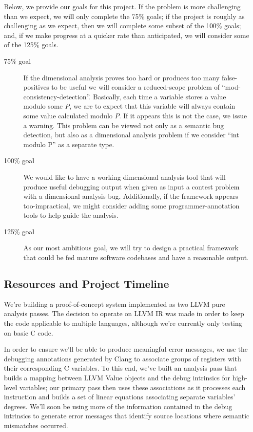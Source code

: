 \documentclass[12pt]{article}
\begin{document}
Below, we provide our goals for this project. If the problem is more challenging than we expect, we will only complete the 75\% goals; if the project is roughly as challenging as we expect, then we will complete some subset of the 100\% goals; and, if we make progress at a quicker rate than anticipated, we will consider some of the 125\% goals.
\begin{description}
\item [75\% goal] If the dimensional analysis proves too hard or produces too many false-positives to be useful we will consider a reduced-scope problem of ``mod-consistency-detection''. Basically, each time a variable stores a value modulo some $P$, we are to expect that this variable will always contain some value calculated modulo $P$. If it appears this is not the case, we issue a warning. This problem can be viewed not only as a semantic bug detection, but also as a dimensional analysis problem if we consider ``int modulo P'' as a separate type.

\item [100\% goal] We would like to have a working dimensional analysis tool that will produce useful debugging output when given as input a contest problem with a dimensional analysis bug. Additionally, if the framework appears too-impractical, we might consider adding some programmer-annotation tools to help guide the analysis. 

\item [125\% goal] As our most ambitious goal, we will try to design a practical framework that could be fed mature software codebases and have a reasonable output.
\end{description}

\subsection{Resources and Project Timeline}

We're building a proof-of-concept system implemented as two LLVM pure analysis passes.
The decision to operate on LLVM IR was made in order to keep the code applicable to multiple languages, although we're currently only testing on basic C code.

In order to ensure we'll be able to produce meaningful error messages, we use the debugging annotations generated by Clang to associate groups of registers with their corresponding C variables.
To this end, we've built an analysis pass that builds a mapping between LLVM Value objects and the debug intrinsics for high-level variables; our primary pass then uses these associations as it processes each instruction and builds a set of linear equations associating separate variables' degrees.
We'll soon be using more of the information contained in the debug intrinsics to generate error messages that identify source locations where semantic mismatches occurred.
\end{document}
